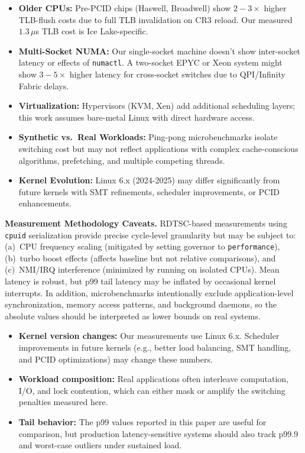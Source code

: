 \documentclass[conference]{IEEEtran}
\begin{document}
\begin{itemize}
  \item \textbf{Older CPUs:} Pre-PCID chips (Haswell, Broadwell) show $2-3\times$
        higher TLB-flush costs due to full TLB invalidation on CR3 reload.
        Our measured $1.3\,\mu$s TLB cost is Ice Lake-specific.

  \item \textbf{Multi-Socket NUMA:} Our single-socket machine doesn't show inter-socket
        latency or effects of \texttt{numactl}. A two-socket EPYC or Xeon system
        might show $3-5\times$ higher latency for cross-socket switches due to QPI/Infinity Fabric delays.

  \item \textbf{Virtualization:} Hypervisors (KVM, Xen) add additional scheduling
        layers; this work assumes bare-metal Linux with direct hardware access.

  \item \textbf{Synthetic vs.\ Real Workloads:} Ping-pong microbenchmarks isolate
        switching cost but may not reflect applications with complex cache-conscious
        algorithms, prefetching, and multiple competing threads.

  \item \textbf{Kernel Evolution:} Linux 6.x (2024-2025) may differ significantly
        from future kernels with SMT refinements, scheduler improvements, or PCID enhancements.
\end{itemize}

\textbf{Measurement Methodology Caveats.}
RDTSC-based measurements using \texttt{cpuid} serialization provide precise
cycle-level granularity but may be subject to:  (a)~CPU frequency scaling
(mitigated by setting governor to \texttt{performance}), (b)~turbo boost
effects (affects baseline but not relative comparisons), and (c)~NMI/IRQ
interference (minimized by running on isolated CPUs).  Mean latency is robust,
but p99 tail latency may be inflated by occasional kernel interrupts.  In
addition, microbenchmarks intentionally exclude application-level synchronization,
memory access patterns, and background daemons, so the absolute values should
be interpreted as lower bounds on real systems.

\begin{itemize}
  \item \textbf{Kernel version changes:} Our measurements use Linux 6.x.
        Scheduler improvements in future kernels (e.g., better load balancing,
        SMT handling, and PCID optimizations) may change these numbers.

  \item \textbf{Workload composition:} Real applications often interleave
        computation, I/O, and lock contention, which can either mask or amplify
        the switching penalties measured here.

  \item \textbf{Tail behavior:} The p99 values reported in this paper are useful
        for comparison, but production latency-sensitive systems should also track
        p99.9 and worst-case outliers under sustained load.
\end{itemize}
\end{document}
